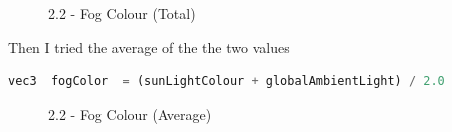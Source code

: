 \documentclass[a4 paper, 12pt]{article}
\begin{document}
\begin{figure} [H]
    \caption{2.2 - Fog Colour (Total)}   
\end{figure}

Then I tried the average of the the two values
\begin{lstlisting}[language=python]
    vec3  fogColor  = (sunLightColour + globalAmbientLight) / 2.0
\end{lstlisting}

\begin{figure} [H]
    \caption{2.2 - Fog Colour (Average)}   
\end{figure}
\end{document}
